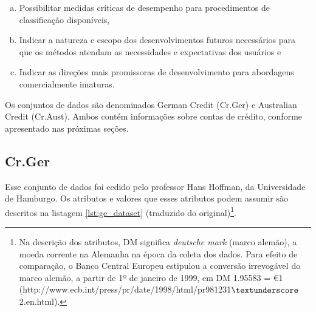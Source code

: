 \begin{enumerate}[a)]
    \item Possibilitar medidas críticas de desempenho para procedimentos de classificação disponíveis,
    \item Indicar a natureza e escopo dos desenvolvimentos futuros necessários para que os métodos atendam as necessidades e expectativas dos usuários e
    \item Indicar as direções mais promissoras de desenvolvimento para abordagens comercialmente imaturas.
\end{enumerate}

Os conjuntos de dados são denominados German Credit (Cr.Ger) e Australian Credit (Cr.Aust). Ambos contém informações sobre contas de crédito, conforme apresentado nas próximas seções.

\subsection{Cr.Ger}

Esse conjunto de dados foi cedido pelo professor Hans Hoffman, da Universidade de Hamburgo. Os atributos e valores que esses atributos podem assumir são descritos na listagem \ref{lst:ge_dataset} (traduzido do original)\footnote{Na descrição dos atributos, DM significa \emph{deutsche mark} (marco alemão), a moeda corrente na Alemanha na época da coleta dos dados. Para efeito de comparação, o Banco Central Europeu estipulou a conversão irrevogável do marco alemão, a partir de 1º de janeiro de 1999, em DM 1.95583 = \euro 1 (http://www.ecb.int/press/pr/date/1998/html/pr981231$\textunderscore$2.en.html).}.

